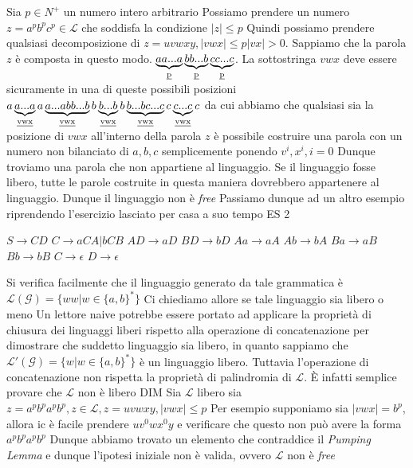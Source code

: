 \documentclass[class=book, crop=false, oneside, 12pt]{standalone}
\begin{document}
	Sia \( p \in N^+\) un numero intero arbitrario
	Possiamo prendere un numero \(z=a^pb^pc^p \in \mathcal{L}\) che soddisfa la condizione \(|z|\leq p\)
	Quindi possiamo prendere qualsiasi decomposizione di \(z = uvwxy, |vwx|\leq p |vx|>0\).
	Sappiamo che la parola \(z\) è composta in questo modo. \(\underbrace{aa...a}_\text{\emph{p}}\underbrace{bb...b}_\text{\emph{p}}\underbrace{cc...c}_\text{\emph{p}}\).
	La sottostringa \(vwx\) deve essere sicuramente in una di queste possibili posizioni
	\(a\underbrace{a...a}_\text{\emph{vwx}}
	a\underbrace{a...abb...b}_\text{\emph{vwx}}
	b\underbrace{b...b}_\text{\emph{vwx}}
	b\underbrace{b...bc...c}_\text{\emph{vwx}}
	c\underbrace{c...c}_\text{\emph{vwx}}c\)
	da cui abbiamo che qualsiasi sia la posizione di \(vwx\) all'interno della parola \(z\) è possibile costruire una parola con un numero non bilanciato di \(a,b,c\) semplicemente ponendo \(v^i,x^i,i=0\)
	Dunque troviamo una parola che non appartiene al linguaggio. Se il linguaggio fosse libero, tutte le parole costruite in questa maniera dovrebbero appartenere al linguaggio. Dunque il linguaggio non è
	\emph{free}
	Passiamo dunque ad un altro esempio riprendendo l'esercizio lasciato per casa a suo tempo
	ES 2

	\(S \rightarrow CD \)
	\(C \rightarrow aCA | bCB \)
	\(AD \rightarrow aD \)
	\(BD \rightarrow bD \)
	\(Aa \rightarrow aA \)
	\(Ab \rightarrow bA \)
	\(Ba \rightarrow aB \)
	\(Bb \rightarrow bB \)
	\(C \rightarrow \epsilon \)
	\(D \rightarrow \epsilon \)

	Si verifica facilmente che il linguaggio generato da tale grammatica è \(\mathcal{L(G)} =\{ww | w\in\{a,b\}^*\}\)
	Ci chiediamo allore se tale linguaggio sia libero o meno
	Un lettore naive potrebbe essere portato ad applicare la proprietà di chiusura dei linguaggi liberi rispetto alla operazione di concatenazione per dimostrare che suddetto linguaggio sia libero, in quanto sappiamo che \(\mathcal{L'(G)} =\{w | w\in\{a,b\}^*\}\) è un linguaggio libero. Tuttavia l'operazione di concatenazione non rispetta la proprietà di palindromia di \(\mathcal{L}\).
	È infatti semplice provare che \(\mathcal{L}\) non è libero
	DIM
	Sia \(\mathcal{L}\) libero
	sia \(z=a^pb^pa^pb^p, z\in \mathcal{L}, z=uvwxy, |vwx|\leq p \)
	Per esempio supponiamo sia \(|vwx|=b^p\), allora ic è facile prendere \(uv^0wx^0y\) e verificare che questo non può avere la forma \(a^pb^pa^pb^p\)
	Dunque abbiamo trovato un elemento che contraddice il \emph{Pumping Lemma} e dunque l'ipotesi iniziale non è valida, ovvero \(\mathcal{L}\) non è \emph{free}
\end{document}
